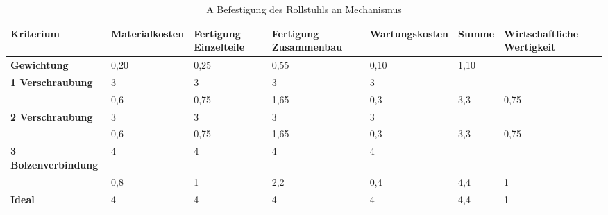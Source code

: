 \documentclass[10pt,a4paper]{article}
\begin{document}
\begin{table}[h!]
    \centering
    \hspace*{-0.14in} %
    \begin{tabular}{>{\bfseries}p{2.5cm} p{2.2cm} p{2cm} p{2cm} p{2.5cm} p{2cm} p{2cm}}
        \toprule
        Kriterium          & Materialkosten & Fertigung Einzelteile & Fertigung Zusammenbau & Wartungskosten & Summe & Wirtschaftliche Wertigkeit \\
        \midrule
        Gewichtung         & 0,20           & 0,25                  & 0,55                  & 0,10           & 1,10  &                            \\
        \midrule
        1 Verschraubung    & 3              & 3                     & 3                     & 3              &       &                            \\
                           & 0,6            & 0,75                  & 1,65                  & 0,3            & 3,3   & 0,75                       \\
        \midrule
        2 Verschraubung    & 3              & 3                     & 3                     & 3              &       &                            \\
                           & 0,6            & 0,75                  & 1,65                  & 0,3            & 3,3   & 0,75                       \\
        \midrule
        3 Bolzenverbindung & 4              & 4                     & 4                     & 4              &       &                            \\
                           & 0,8            & 1                     & 2,2                   & 0,4            & 4,4   & 1                          \\
        \midrule
        Ideal              & 4              & 4                     & 4                     & 4              & 4,4   & 1                          \\
        \bottomrule
    \end{tabular}
    \caption{A Befestigung des Rollstuhls an Mechanismus}
\end{table}
\end{document}
